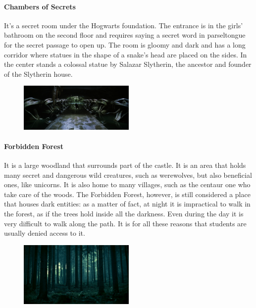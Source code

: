 \paragraph{Chambers of Secrets}
It's a secret room under the Hogwarts foundation. The entrance is in the girls' bathroom on the second floor and requires saying a secret word in parseltongue for the secret passage to open up. The room is gloomy and dark and has a long corridor where statues in the shape of a snake's head are placed on the sides. In the center stands a colossal statue by Salazar Slytherin, the ancestor and founder of the Slytherin house.  
\begin{figure}
\centering
\includegraphics[max width=0.5\textwidth]{../Pictures/Locations/Hogwarts/Chamber_Secrets_picture.png} 
\end{figure}

\paragraph{Forbidden Forest}
It is a large woodland that surrounds part of the castle. It is an area that holds many secret and dangerous wild creatures, such as werewolves, but also beneficial ones, like unicorns. It is also home to many villages, such as the centaur one who take care of the woods. The Forbidden Forest, however, is still considered a place that houses dark entities: as a matter of fact, at night it is impractical to walk in the forest, as if the trees hold inside all the darkness. Even during the day it is very difficult to walk along the path. It is for all these reasons that students are usually denied access to it. 
\begin{figure}
\centering
\includegraphics[max width=0.5\textwidth]{../Pictures/Locations/Hogwarts/Forbidden_Forest_picture.jpg} 
\end{figure}

